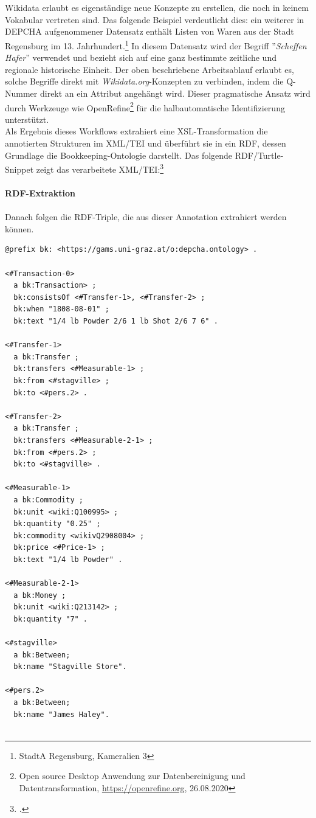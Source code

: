 \documentclass[12pt,a4paper]{article}
\begin{document}
\\
\\
Wikidata erlaubt es eigenständige neue Konzepte zu erstellen, die noch in keinem Vokabular vertreten sind. Das folgende Beispiel verdeutlicht dies: ein weiterer in DEPCHA aufgenommener Datensatz enthält Listen von Waren aus der Stadt Regensburg im 13. Jahrhundert.\footnote{StadtA Regensburg, Kameralien 3} In diesem Datensatz wird der Begriff ''\textit{Scheffen Hafer}'' verwendet und bezieht sich auf eine ganz bestimmte zeitliche und regionale historische Einheit. Der oben beschriebene Arbeitsablauf erlaubt es, solche Begriffe direkt mit \textit{Wikidata.org}-Konzepten zu verbinden, indem die Q-Nummer direkt an ein Attribut angehängt wird. Dieser pragmatische Ansatz wird durch Werkzeuge wie OpenRefine\footnote{Open source Desktop Anwendung zur Datenbereinigung und Datentransformation, \url{https://openrefine.org}, 26.08.2020} für die halbautomatische Identifizierung unterstützt.
\\
Als Ergebnis dieses Workflows extrahiert eine XSL-Transformation die annotierten Strukturen im XML/TEI und überführt sie in ein RDF, dessen Grundlage die Bookkeeping-Ontologie darstellt. Das folgende RDF/Turtle-Snippet zeigt das verarbeitete XML/TEI:\footcite[][S.10-15]{pollin2019digital}
\\
\\
\textbf{RDF-Extraktion}
\\
\\
Danach folgen die RDF-Triple, die aus dieser Annotation extrahiert werden können.
\begin{lstlisting}[]
@prefix bk: <https://gams.uni-graz.at/o:depcha.ontology> .

<#Transaction-0>
  a bk:Transaction> ;
  bk:consistsOf <#Transfer-1>, <#Transfer-2> ;
  bk:when "1808-08-01" ;
  bk:text "1/4 lb Powder 2/6 1 lb Shot 2/6 7 6" .

<#Transfer-1>
  a bk:Transfer ;
  bk:transfers <#Measurable-1> ;
  bk:from <#stagville> ;
  bk:to <#pers.2> .

<#Transfer-2>
  a bk:Transfer ;
  bk:transfers <#Measurable-2-1> ;
  bk:from <#pers.2> ;
  bk:to <#stagville> .

<#Measurable-1>
  a bk:Commodity ;
  bk:unit <wiki:Q100995> ;
  bk:quantity "0.25" ;
  bk:commodity <wikivQ2908004> ;
  bk:price <#Price-1> ;
  bk:text "1/4 lb Powder" .

<#Measurable-2-1>
  a bk:Money ;
  bk:unit <wiki:Q213142> ;
  bk:quantity "7" .
  
<#stagville>
  a bk:Between;
  bk:name "Stagville Store".
  
<#pers.2>
  a bk:Between;
  bk:name "James Haley".
  
\end{lstlisting}
\end{document}

